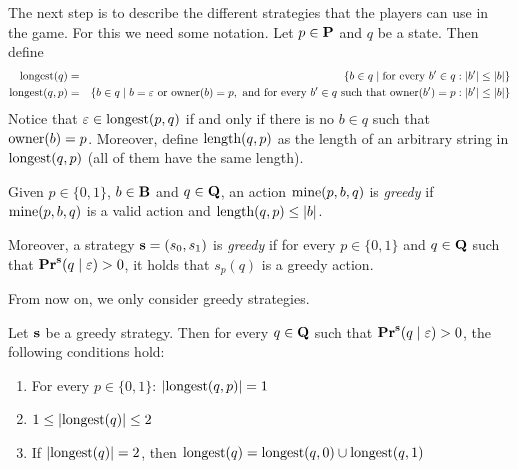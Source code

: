 The next step is to describe the different strategies that the players can use in the game. For this we need some notation. Let $p \in \mathbf{P}$ and $q$ be a state. Then define
\begin{eqnarray*}
{\text{\rm longest}}(q) & = & \{ b \in q \mid \text{for every } b' \in q: |b'| \leq |b|\}\\
{\text{\rm longest}}(q,p) & = & \{ b \in q \mid b = \varepsilon \text{ or } \text{\rm owner}(b) = p, \text{ and for every } b' \in q \text{ such that } \text{\rm owner}(b') = p : |b'| \leq |b|\}
\end{eqnarray*}
Notice that $\varepsilon \in {\text{\rm longest}}(p,q)$ if and only if there is no $b \in q$ such that $\text{\rm owner}(b) = p$. Moreover, define $\text{\rm length}(q,p)$ as the length of an arbitrary string in ${\text{\rm longest}}(q,p)$ (all of them have the same length).
\begin{mydef}\label{def-greedy}
Given $p \in \{0,1\}$, $b \in \mathbf{B}$ and $q \in \mathbf{Q}$,  an action $\text{\rm mine}(p,b,q)$ is {\em greedy} if $\text{\rm mine}(p,b,q)$ is a valid action and $\text{\rm length}(q,p) \leq |b|$.

Moreover, a strategy $\mathbf{s} = (s_0, s_1)$ is {\em greedy} if for every $p \in \{0,1\}$ and  $q \in \mathbf{Q}$ such that $\mathbf{Pr}^{\mathbf{s}}(q \mid \varepsilon) > 0$, it holds that $s_p(q)$ is a greedy action.
\end{mydef}
From now on, we only consider greedy strategies. 
%

 

\begin{myprop}\label{prop-length-greedy}
Let $\mathbf{s}$ be a greedy strategy. Then for every $q \in \mathbf{Q}$ such that $\mathbf{Pr}^{\mathbf{s}}(q \mid \varepsilon) > 0$, the following conditions hold:
\begin{enumerate}
\item For every $p \in \{0,1\}$: $|{\text{\rm longest}}(q,p)| = 1$ 

\item $1 \leq |{\text{\rm longest}}(q)| \leq 2$

\item If $|{\text{\rm longest}}(q)| = 2$, then ${\text{\rm longest}}(q) = {\text{\rm longest}}(q,0) \cup {\text{\rm longest}}(q,1)$
\end{enumerate}
\end{myprop}

